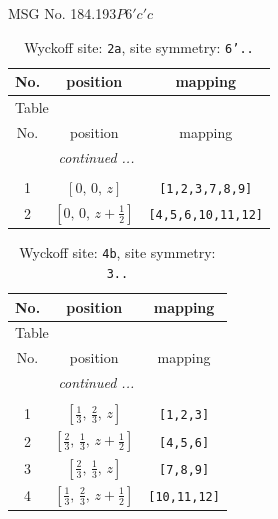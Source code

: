 \documentclass[fleqn,8pt]{jsarticle}
\begin{document}
\setcounter{MaxMatrixCols}{32}

\renewcommand{\tablename}{Table~}
\renewcommand{\figurename}{Figure~}
\begin{center}
\LARGE
MSG No. 184.193\quad$P6'c'c$
\end{center}
\renewcommand{\arraystretch}{1.2}
\begin{longtable}{ccc}
\caption{Wyckoff site: {\tt 2a}, site symmetry: {\tt 6'..}}
 \\
 \hline \hline
No. & position & mapping \\ \hline \endfirsthead

\multicolumn{2}{l}{\tablename\ \thetable{}} \\
 \hline \hline
No. & position & mapping \\ \hline \endhead

 \hline \hline
\multicolumn{2}{r}{\footnotesize\it continued ...} \\ \endfoot

 \hline \hline
\multicolumn{2}{r}{} \\ \endlastfoot

1 & $\left[ 0,\, 0,\, z \right]$ & {\tt [1,2,3,7,8,9]} \\ \hline
2 & $\left[ 0,\, 0,\, z + \frac{1}{2} \right]$ & {\tt [4,5,6,10,11,12]} \\
\end{longtable}
\renewcommand{\arraystretch}{1.2}
\begin{longtable}{ccc}
\caption{Wyckoff site: {\tt 4b}, site symmetry: {\tt 3..}}
 \\
 \hline \hline
No. & position & mapping \\ \hline \endfirsthead

\multicolumn{2}{l}{\tablename\ \thetable{}} \\
 \hline \hline
No. & position & mapping \\ \hline \endhead

 \hline \hline
\multicolumn{2}{r}{\footnotesize\it continued ...} \\ \endfoot

 \hline \hline
\multicolumn{2}{r}{} \\ \endlastfoot

1 & $\left[ \frac{1}{3},\, \frac{2}{3},\, z \right]$ & {\tt [1,2,3]} \\ \hline
2 & $\left[ \frac{2}{3},\, \frac{1}{3},\, z + \frac{1}{2} \right]$ & {\tt [4,5,6]} \\ \hline
3 & $\left[ \frac{2}{3},\, \frac{1}{3},\, z \right]$ & {\tt [7,8,9]} \\ \hline
4 & $\left[ \frac{1}{3},\, \frac{2}{3},\, z + \frac{1}{2} \right]$ & {\tt [10,11,12]} \\
\end{longtable}
\end{document}
